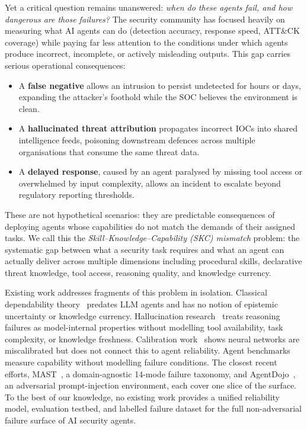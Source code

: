 \documentclass[journal,compsoc]{IEEEtran}
\begin{document}
Yet a critical question remains unanswered: \textit{when do these agents fail,
and how dangerous are those failures?} The security community has focused
heavily on measuring what AI agents can do (detection accuracy, response
speed, ATT\&CK coverage) while paying far less attention to the conditions
under which agents produce incorrect, incomplete, or actively misleading
outputs. This gap carries serious operational consequences:

\begin{itemize}[noitemsep, leftmargin=*]
  \item A \textbf{false negative} allows an intrusion to persist undetected
    for hours or days, expanding the attacker's foothold while the SOC
    believes the environment is clean.
  \item A \textbf{hallucinated threat attribution} propagates incorrect IOCs
    into shared intelligence feeds, poisoning downstream defences across
    multiple organisations that consume the same threat data.
  \item A \textbf{delayed response}, caused by an agent paralysed by missing
    tool access or overwhelmed by input complexity, allows an incident to
    escalate beyond regulatory reporting thresholds.
\end{itemize}

These are not hypothetical scenarios: they are predictable consequences of
deploying agents whose capabilities do not match the demands of their assigned
tasks. We call this the \textit{Skill--Knowledge--Capability (SKC) mismatch}
problem: the systematic gap between what a security task requires and what
an agent can actually deliver across multiple dimensions including procedural
skills, declarative threat knowledge, tool access, reasoning quality, and
knowledge currency.

Existing work addresses fragments of this problem in isolation. Classical
dependability theory~\cite{avizienis2004} predates LLM agents and has no
notion of epistemic uncertainty or knowledge currency.
Hallucination research~\cite{llmagent_halluc_survey2025} treats reasoning
failures as model-internal properties without modelling tool availability,
task complexity, or knowledge freshness. Calibration
work~\cite{guo2017calibration} shows neural networks are miscalibrated but
does not connect this to agent reliability. Agent
benchmarks~\cite{liu2023agentbench} measure capability
without modelling failure conditions. The closest
recent efforts, MAST~\cite{cemri2025mast}, a domain-agnostic 14-mode
failure taxonomy, and AgentDojo~\cite{debenedetti2024agentdojo}, an
adversarial prompt-injection environment, each cover one slice of
the surface. To the best of our knowledge, no existing work provides a
unified reliability model, evaluation testbed, and labelled failure
dataset for the full non-adversarial failure surface of AI security
agents.
\end{document}
